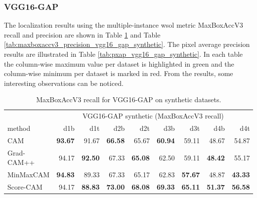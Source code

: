 \subsubsection{VGG16-GAP}
The localization results using the multiple-instance \acrshort{wsol} metric MaxBoxAccV3 recall and precision are shown in Table \ref{tab:maxboxaccv3_recall_vgg16_gap_synthetic} and Table \ref{tab:maxboxaccv3_precision_vgg16_gap_synthetic}. The pixel average precision results are illustrated in Table \ref{tab:pxap_vgg16_gap_synthetic}. In each table the column-wise maximum value per dataset is highlighted in green and the column-wise minimum per dataset is marked in red. From the results, some interesting observations can be noticed.
\begin{table}[ht]
\centering
\begin{tabular}{lrrrrrrrr}
\toprule
 & \multicolumn{8}{c}{VGG16-GAP synthetic (MaxBoxAccV3 recall)} \\
method & d1b & d1t & d2b & d2t & d3b & d3t & d4b & d4t \\
\cmidrule(lr){1-1} \cmidrule(lr){2-9} 
CAM & \color{purple} \bfseries 93.67 & 91.67 & \color{purple} \bfseries 66.58 & 65.67 & \color{purple} \bfseries 60.94 & 59.11 & 48.67 & 54.87 \\
Grad-CAM++ & 94.17 & \color{teal} \bfseries 92.50 & 67.33 & \color{purple} \bfseries 65.08 & 62.50 & 59.11 & \color{purple} \bfseries 48.42 & 55.17 \\
MinMaxCAM & \color{teal} \bfseries 94.83 & 89.33 & 67.33 & 65.17 & 62.83 & \color{purple} \bfseries 57.67 & 48.87 & \color{purple} \bfseries 43.33 \\
Score-CAM & 94.17 & \color{purple} \bfseries 88.83 & \color{teal} \bfseries 73.00 & \color{teal} \bfseries 68.08 & \color{teal} \bfseries 69.33 & \color{teal} \bfseries 65.11 & \color{teal} \bfseries 51.37 & \color{teal} \bfseries 56.58 \\
\bottomrule
\end{tabular}
\caption[MaxBoxAccV3 for VGG16-GAP on synthetic datasets]{MaxBoxAccV3 recall for VGG16-GAP on synthetic datasets.}
\label{tab:maxboxaccv3_recall_vgg16_gap_synthetic}
\end{table}

